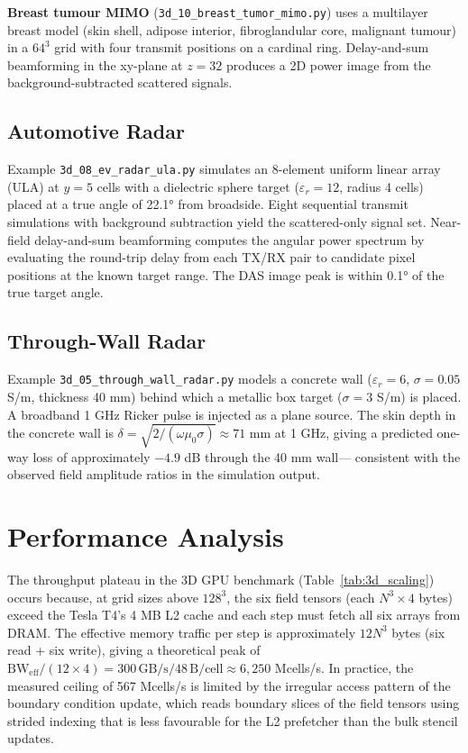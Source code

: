 \documentclass[10pt,twocolumn]{article}
\begin{document}
\textbf{Breast tumour MIMO} (\texttt{3d\_10\_breast\_tumor\_mimo.py}) uses a
multilayer breast model (skin shell, adipose interior, fibroglandular core,
malignant tumour) in a $64^3$ grid with four transmit positions on a cardinal
ring. Delay-and-sum beamforming in the xy-plane at $z = 32$ produces a 2D
power image from the background-subtracted scattered signals.

\subsection{Automotive Radar}

Example \texttt{3d\_08\_ev\_radar\_ula.py} simulates an 8-element uniform
linear array (ULA) at $y = 5$ cells with a dielectric sphere target
($\varepsilon_r = 12$, radius 4 cells) placed at a true angle of 22.1°
from broadside. Eight sequential transmit simulations with background
subtraction yield the scattered-only signal set. Near-field delay-and-sum
beamforming computes the angular power spectrum by evaluating the round-trip
delay from each TX/RX pair to candidate pixel positions at the known target
range. The DAS image peak is within 0.1° of the true target angle.

\subsection{Through-Wall Radar}

Example \texttt{3d\_05\_through\_wall\_radar.py} models a concrete wall
($\varepsilon_r = 6$, $\sigma = 0.05$ S/m, thickness 40 mm) behind which a
metallic box target ($\sigma = 3$ S/m) is placed. A broadband 1 GHz Ricker
pulse is injected as a plane source. The skin depth in the concrete wall
is $\delta = \sqrt{2/(\omega\mu_0\sigma)} \approx 71$ mm at 1 GHz, giving
a predicted one-way loss of approximately $-4.9$ dB through the 40 mm wall—
consistent with the observed field amplitude ratios in the simulation output.

\section{Performance Analysis}
\label{sec:performance}

The throughput plateau in the 3D GPU benchmark (Table~\ref{tab:3d_scaling})
occurs because, at grid sizes above $128^3$, the six field tensors
(each $N^3 \times 4$ bytes) exceed the Tesla T4's 4 MB L2 cache and each
step must fetch all six arrays from DRAM. The effective memory traffic per
step is approximately $12 N^3$ bytes (six read + six write), giving a
theoretical peak of $\text{BW}_\text{eff} / (12 \times 4) =
300\,\text{GB/s} / 48\,\text{B/cell} \approx 6{,}250$ Mcells/s.
In practice, the measured ceiling of 567 Mcells/s is limited by the
irregular access pattern of the boundary condition update, which reads
boundary slices of the field tensors using strided indexing that is less
favourable for the L2 prefetcher than the bulk stencil updates.
\end{document}
